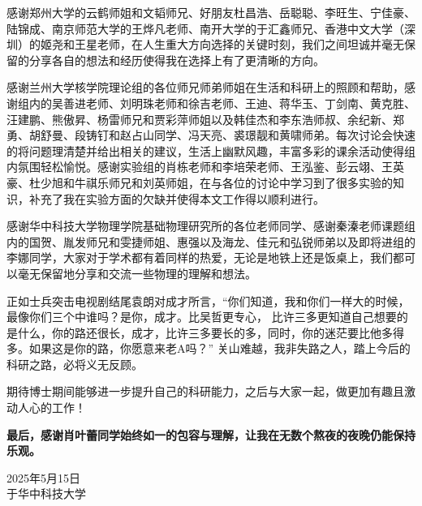 \documentclass{LZUThesis-PgD&PhD}
\newcommand{\tb}[1]{\textbf{#1}}
\begin{document}
感谢郑州大学的云鹤师姐和文韬师兄、好朋友杜昌浩、岳聪聪、李旺生、宁佳豪、陆锦成、南京师范大学的王烨凡老师、南开大学的于汇鑫师兄、香港中文大学（深圳）的姬尧和王星老师，在人生重大方向选择的关键时刻，我们之间坦诚并毫无保留的分享各自的想法和经历使得我在选择上有了更清晰的方向。

感谢兰州大学核学院理论组的各位师兄师弟师姐在生活和科研上的照顾和帮助，感谢组内的吴善进老师、刘明珠老师和徐吉老师、王迪、蒋华玉、丁剑南、黄克胜、汪建鹏、熊傲昇、杨雷师兄和贾彩萍师姐以及韩佳杰和李东浩师叔、余纪新、郑勇、胡舒曼、段铸钉和赵占山同学、冯天亮、裘璟靓和黄啸师弟。每次讨论会快速的将问题理清楚并给出相关的建议，生活上幽默风趣，丰富多彩的课余活动使得组内氛围轻松愉悦。感谢实验组的肖栋老师和李培荣老师、王泓鉴、彭云翊、王英豪、杜少旭和牛祺乐师兄和刘英师姐，在与各位的讨论中学习到了很多实验的知识，补充了我在实验方面的欠缺并使得本文工作得以顺利进行。

感谢华中科技大学物理学院基础物理研究所的各位老师同学、感谢秦溱老师课题组内的国贺、胤发师兄和雯捷师姐、惠强以及海龙、佳元和弘锐师弟以及即将进组的李娜同学，大家对于学术都有着同样的热爱，无论是地铁上还是饭桌上，我们都可以毫无保留地分享和交流一些物理的理解和想法。

正如士兵突击电视剧结尾袁朗对成才所言，“你们知道，我和你们一样大的时候，最像你们三个中谁吗？是你，成才。比吴哲更专心， 比许三多更知道自己想要的是什么，你的路还很长，成才，比许三多要长的多，同时，你的迷茫要比他多得多。如果这是你的路，你愿意来老A吗？” 关山难越，我非失路之人，踏上今后的科研之路，必将义无反顾。

期待博士期间能够进一步提升自己的科研能力，之后与大家一起，做更加有趣且激动人心的工作！

\tb{最后，感谢肖叶蕾同学始终如一的包容与理解，让我在无数个熬夜的夜晚仍能保持乐观。}

\vspace{4\baselineskip}
2025年5月15日\\
    于华中科技大学
\end{document}
